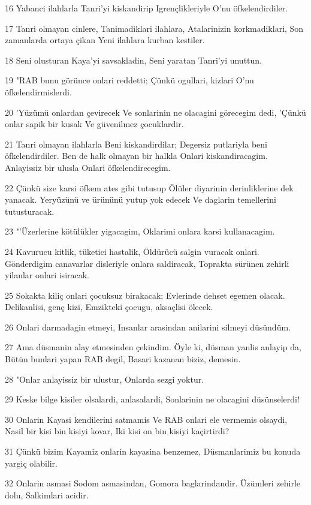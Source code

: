 \par 16 Yabanci ilahlarla Tanri'yi kiskandirip Igrençlikleriyle O'nu öfkelendirdiler.
\par 17 Tanri olmayan cinlere, Tanimadiklari ilahlara, Atalarinizin korkmadiklari, Son zamanlarda ortaya çikan Yeni ilahlara kurban kestiler.
\par 18 Seni olusturan Kaya'yi savsakladin, Seni yaratan Tanri'yi unuttun.
\par 19 "RAB bunu görünce onlari reddetti; Çünkü ogullari, kizlari O'nu öfkelendirmislerdi.
\par 20 'Yüzümü onlardan çevirecek Ve sonlarinin ne olacagini görecegim dedi, 'Çünkü onlar sapik bir kusak Ve güvenilmez çocuklardir.
\par 21 Tanri olmayan ilahlarla Beni kiskandirdilar; Degersiz putlariyla beni öfkelendirdiler. Ben de halk olmayan bir halkla Onlari kiskandiracagim. Anlayissiz bir ulusla Onlari öfkelendirecegim.
\par 22 Çünkü size karsi öfkem ates gibi tutusup Ölüler diyarinin derinliklerine dek yanacak. Yeryüzünü ve ürününü yutup yok edecek Ve daglarin temellerini tutusturacak.
\par 23 "'Üzerlerine kötülükler yigacagim, Oklarimi onlara karsi kullanacagim.
\par 24 Kavurucu kitlik, tüketici hastalik, Öldürücü salgin vuracak onlari. Gönderdigim canavarlar disleriyle onlara saldiracak, Toprakta sürünen zehirli yilanlar onlari isiracak.
\par 25 Sokakta kiliç onlari çocuksuz birakacak; Evlerinde dehset egemen olacak. Delikanlisi, genç kizi, Emzikteki çocugu, aksaçlisi ölecek.
\par 26 Onlari darmadagin etmeyi, Insanlar arasindan anilarini silmeyi düsündüm.
\par 27 Ama düsmanin alay etmesinden çekindim. Öyle ki, düsman yanlis anlayip da, Bütün bunlari yapan RAB degil, Basari kazanan biziz, demesin.
\par 28 "Onlar anlayissiz bir ulustur, Onlarda sezgi yoktur.
\par 29 Keske bilge kisiler olsalardi, anlasalardi, Sonlarinin ne olacagini düsünselerdi!
\par 30 Onlarin Kayasi kendilerini satmamis Ve RAB onlari ele vermemis olsaydi, Nasil bir kisi bin kisiyi kovar, Iki kisi on bin kisiyi kaçirtirdi?
\par 31 Çünkü bizim Kayamiz onlarin kayasina benzemez, Düsmanlarimiz bu konuda yargiç olabilir.
\par 32 Onlarin asmasi Sodom asmasindan, Gomora baglarindandir. Üzümleri zehirle dolu, Salkimlari acidir.
